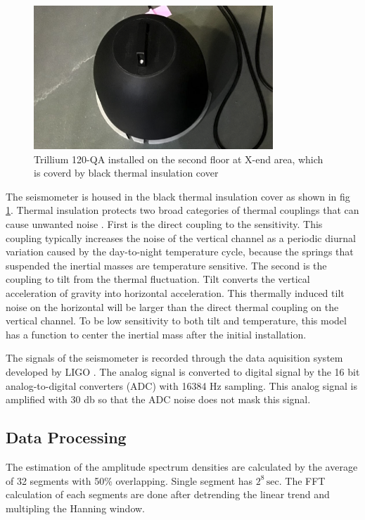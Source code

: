 \begin{figure}[h]
  \begin{center}   
    \includegraphics[width=9.0cm]{./img_chap3/img316.png}
    \caption{Trillium 120-QA installed on the second floor at X-end area, which is coverd by black thermal insulation cover}\label{img:img316}
  \end{center}
\end{figure}

The seismometer is housed in the black thermal insulation cover as shown in fig \ref{img:img316}. Thermal insulation protects two broad categories of thermal couplings that can cause unwanted noise \cite{trillium120manual}. First is the direct coupling to the sensitivity. This coupling typically increases the noise of the vertical channel as a periodic diurnal variation caused by the day-to-night temperature cycle, because the springs that suspended the inertial masses are temperature sensitive. The second is the coupling to tilt from the thermal fluctuation. Tilt converts the vertical acceleration of gravity into horizontal acceleration. This thermally induced tilt noise on the horizontal will be larger than the direct thermal coupling on the vertical channel. To be low sensitivity to both tilt and temperature, this model has a function to center the inertial mass after the initial installation.

The signals of the seismometer is recorded through the data aquisition system developed by LIGO \cite{bork2001overview}. The analog signal is converted to digital signal by the 16 bit analog-to-digital converters (ADC) with 16384 $\mathrm{Hz}$ sampling. This analog signal is amplified with 30 db so that the ADC noise does not mask this signal. 

\subsection{Data Processing}
The estimation of the amplitude spectrum densities are calculated by the average of 32 segments with 50\% overlapping. Single segment has $2^8\,\mathrm{sec}$. The FFT calculation of each segments are done after detrending the linear trend and multipling the Hanning window. 

